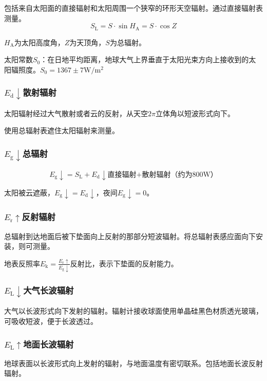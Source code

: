 \documentclass[UTF8,11pt]{ctexbook}
\begin{document}
包括来自太阳面的直接辐射和太阳周围一个狭窄的环形天空辐射。通过直接辐射表测量。
\[
S_\mathrm{L}=S\cdot\sin H_\mathrm{A}=S\cdot\cos Z
\]

\(H_\mathrm{A}\)为太阳高度角，\(Z\)为天顶角，\(S\)为总辐射。

太阳常数\(S_0\)：在日地平均距离，地球大气上界垂直于太阳光束方向上接收到的太阳辐照度。\(S_0=1367\pm7\mathrm{W/m^2}\)

\subsubsection{\(E_\mathrm{d}\downarrow\)散射辐射}

太阳辐射经过大气散射或者云的反射，从天空\(2\pi\)立体角以短波形式向下。

使用总辐射表遮住太阳辐射来测量。

\subsubsection{\(E_\mathrm{g}\downarrow\)总辐射}
\[
E_\mathrm{g}\downarrow=S_\mathrm{L}+E_\mathrm{d}\downarrow\text{直接辐射+散射辐射（约为800W）}
\]

太阳被云遮蔽，\(E_\mathrm{g}\downarrow=E_\mathrm{d}\downarrow\)，夜间\(E_\mathrm{g}\downarrow=0\)。

\subsubsection{\(E_\mathrm{r}\uparrow\)反射辐射}

总辐射到达地面后被下垫面向上反射的那部分短波辐射。将总辐射表感应面向下安装，则可测量。

地表反照率\(E_\mathrm{k}=\frac{E_\mathrm{r}\uparrow}{E_\mathrm{g}\downarrow}\)反射比，表示下垫面的反射能力。

\subsubsection{\(E_\mathrm{L}\downarrow\)大气长波辐射}

大气以长波形式向下发射的辐射。辐射计接收球面使用单晶硅黑色材质透光玻璃，可吸收短波，便于长波透过。

\subsubsection{\(E_\mathrm{L}\uparrow\)地面长波辐射}

地球表面以长波形式向上发射的辐射，与地面温度有密切联系。包括地面长波反射辐射。
\end{document}
